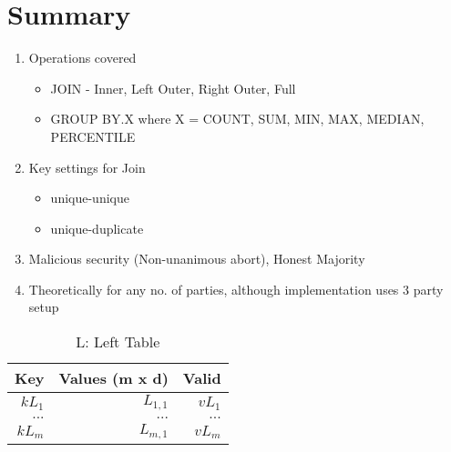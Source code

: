 
\clearpage
{}

%
\setcounter{section}{0} %

\section{Summary}
\begin{enumerate}
    \item Operations covered
    \begin{itemize}
        \item JOIN - Inner, Left Outer, Right Outer, Full
        \item GROUP BY.X where X = COUNT, SUM, MIN, MAX, MEDIAN, PERCENTILE
    \end{itemize}
    \item Key settings for Join
    \begin{itemize}
        \item unique-unique
        \item unique-duplicate
    \end{itemize}
    \item Malicious security (Non-unanimous abort), Honest Majority
    \item Theoretically for any no. of parties, although implementation uses 3 party setup
\end{enumerate}

\begin{table}
	\centering
	\begin{tabular}{ |r|r|r| } 
		\hline
		\textbf{Key} & \textbf{Values (m x d)} & \textbf{Valid} \\ \hline
		$kL_1$  & $L_{1,1}$ & $vL_1$ \\ \hline
		$...$  & $...$ & $...$ \\ \hline
		$kL_m$  & $L_{m,1}$ & $vL_m$ \\ \hline
	\end{tabular}
	\caption{L: Left Table}
\end{table}


